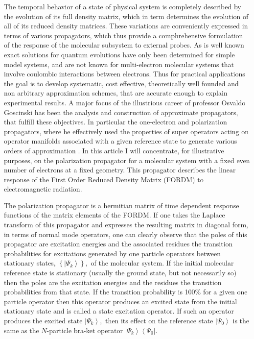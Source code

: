 \documentclass[aps,preprint]{revtex4}%
\begin{document}
The temporal behavior of a state of physical system is completely described by
the evolution of its full density matrix, which in term determines the
evolution of all of its reduced density matrices. These variations are
conveniently expressed in terms of various propagators, which thus provide a
comphrehensive formulation of the response of the molecular subsystem to
external probes. As is well known exact solutions for quantum evolutions have
only been determined for simple model systems, and are not known for
multi-electron molecular systems that involve coulombic interactions between
electrons. Thus for practical applications the goal is to develop systematic,
cost effective, theoretically well founded and non arbitrary approximation
schemes, that are accurate enough to explain experimental results. A major
focus of the illustrious career of professor Osvaldo Goscinski has been the
analysis and construction of approximate propagators, that fulfill these
objectives. In particular the one-electron and polarization propagators, where
he effectively used the properties of super operators acting on operator
manifolds associated with a given reference state to generate various orders
of approximation \cite{Goscinski73}\cite{Pickup73}\cite{Goscinski69}%
\cite{Goscinski70}\cite{Weiner80a}\cite{Goscinski80}\cite{Howat77a}. In this
article I will concentrate, for illustrative purposes, on the polarization
propagator for a molecular system with a fixed even number of electrons at a
fixed geometry. This propagator describes the linear response of the First
Order Reduced Density Matrix (FORDM) to electromagnetic radiation.

The polarization propagator is a hermitian matrix of time dependent response
functions of the matrix elements of the FORDM. If one takes the Laplace
transform of this propagator and expresses the resulting matrix in diagonal
form, in terms of normal mode operators, one can clearly observe that the
poles of this propagator are excitation energies and the associated residues
the transition probabilities for excitations generated by one particle
operators between stationary states, $\left\{  \left\vert \Psi_{k}%
\right\rangle \right\}  ,$ of the molecular system. If the initial molecular
reference state is stationary (usually the ground state, but not necessarily
so) then the poles are the excitation energies and the residues the transition
probabilities from that state. If the transition probability is 100\% for a
given one particle operator then this operator produces an excited state from
the initial stationary state and is called a state excitation operator. If
such an operator produces the excited state $\left\vert \Psi_{k}\right\rangle
,$ then its effect on the reference state $\left\vert \Psi_{0}\right\rangle $
is the same as the $N$-particle bra-ket operator $\left\vert \Psi
_{k}\right\rangle \left\langle \Psi_{0}\right\vert .$
\end{document}
